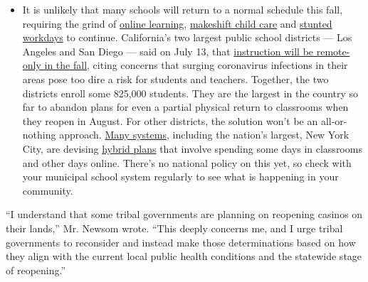 \begin{itemize}
  \begin{itemize}
  \tightlist
  \item
    It is unlikely that many schools will return to a normal schedule
    this fall, requiring the grind of
    \href{https://www.nytimes3xbfgragh.onion/2020/06/05/us/coronavirus-education-lost-learning.html?action=click\&pgtype=Article\&state=default\&region=MAIN_CONTENT_3\&context=storylines_faq}{online
    learning},
    \href{https://www.nytimes3xbfgragh.onion/2020/05/29/us/coronavirus-child-care-centers.html?action=click\&pgtype=Article\&state=default\&region=MAIN_CONTENT_3\&context=storylines_faq}{makeshift
    child care} and
    \href{https://www.nytimes3xbfgragh.onion/2020/06/03/business/economy/coronavirus-working-women.html?action=click\&pgtype=Article\&state=default\&region=MAIN_CONTENT_3\&context=storylines_faq}{stunted
    workdays} to continue. California's two largest public school
    districts --- Los Angeles and San Diego --- said on July 13, that
    \href{https://www.nytimes3xbfgragh.onion/2020/07/13/us/lausd-san-diego-school-reopening.html?action=click\&pgtype=Article\&state=default\&region=MAIN_CONTENT_3\&context=storylines_faq}{instruction
    will be remote-only in the fall}, citing concerns that surging
    coronavirus infections in their areas pose too dire a risk for
    students and teachers. Together, the two districts enroll some
    825,000 students. They are the largest in the country so far to
    abandon plans for even a partial physical return to classrooms when
    they reopen in August. For other districts, the solution won't be an
    all-or-nothing approach.
    \href{https://bioethics.jhu.edu/research-and-outreach/projects/eschool-initiative/school-policy-tracker/}{Many
    systems}, including the nation's largest, New York City, are
    devising
    \href{https://www.nytimes3xbfgragh.onion/2020/06/26/us/coronavirus-schools-reopen-fall.html?action=click\&pgtype=Article\&state=default\&region=MAIN_CONTENT_3\&context=storylines_faq}{hybrid
    plans} that involve spending some days in classrooms and other days
    online. There's no national policy on this yet, so check with your
    municipal school system regularly to see what is happening in your
    community.
  \end{itemize}
\end{itemize}

``I understand that some tribal governments are planning on reopening
casinos on their lands,'' Mr. Newsom wrote. ``This deeply concerns me,
and I urge tribal governments to reconsider and instead make those
determinations based on how they align with the current local public
health conditions and the statewide stage of reopening.''

